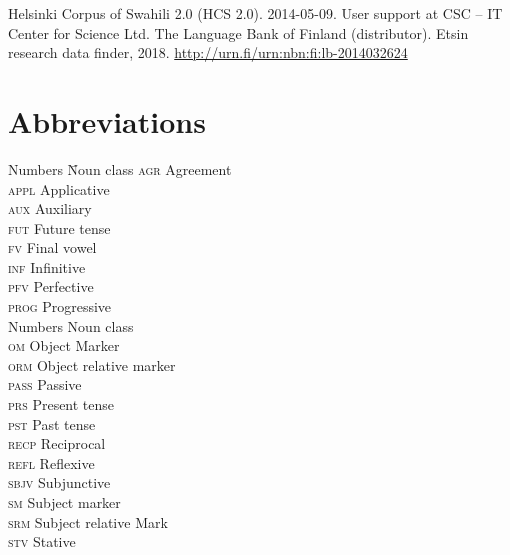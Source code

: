 \documentclass[output=paper,colorlinks,citecolor=brown]{langscibook}
\begin{document}
Helsinki Corpus of Swahili 2.0 (HCS 2.0). 2014-05-09. User support at CSC -- IT Center for Science Ltd. The Language Bank of Finland (distributor). Etsin research data finder, 2018. \url{http://urn.fi/urn:nbn:fi:lb-2014032624}

\section*{Abbreviations}
\begin{multicols}{2}
\begin{tabbing}
Numbers  \hspace{1ex} \= Noun class   \kill
\textsc{agr}   \> Agreement    \\ 
\textsc{appl}  \> Applicative  \\ 
\textsc{aux}   \> Auxiliary    \\ 
\textsc{fut}   \> Future tense \\ 
\textsc{fv}    \> Final vowel  \\ 
\textsc{inf}   \> Infinitive   \\ 
\textsc{pfv}   \> Perfective   \\ 
\textsc{prog}  \> Progressive  \\ 
Numbers        \> Noun class   \\ 
\textsc{om}    \> Object Marker\\ 
\textsc{orm}   \> Object relative marker\\
\textsc{pass}  \> Passive\\
\textsc{prs}   \> Present tense\\
\textsc{pst}   \> Past tense\\
\textsc{recp}  \> Reciprocal\\
\textsc{refl}  \> Reflexive\\
\textsc{sbjv}  \> Subjunctive\\
\textsc{sm}    \> Subject marker\\
\textsc{srm}   \> Subject relative Mark\\
\textsc{stv}   \> Stative
\end{tabbing}
\end{multicols}

{\sloppy\printbibliography[heading=subbibliography,notkeyword=this]}
\end{document}
